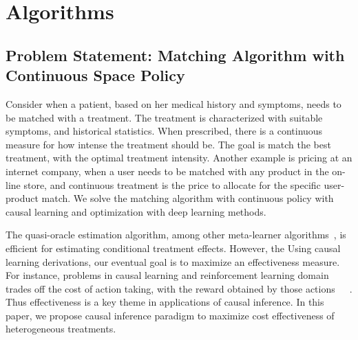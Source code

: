 \documentclass{article}
\begin{document}
\section{Algorithms} 
\subsection{Problem Statement: Matching Algorithm with Continuous Space Policy} 
Consider when a patient, based on her medical history and symptoms, needs to be matched with a treatment. The treatment is characterized with suitable symptoms, and historical statistics. When prescribed, there is a continuous measure for how intense the treatment should be. The goal is match the best treatment, with the optimal treatment intensity. Another example is pricing at an internet company, when a user needs to be matched with any product in the on-line store, and continuous treatment is the price to allocate for the specific user-product match. We solve the matching algorithm with continuous policy with causal learning and optimization with deep learning methods. 

The quasi-oracle estimation algorithm, among other meta-learner algorithms~\cite{kunzel2017meta}, is efficient for estimating conditional treatment effects. However, the Using causal learning derivations, our eventual goal is to maximize an effectiveness measure. For instance, problems in causal learning and reinforcement learning domain trades off the cost of action taking, with the reward obtained by those  actions~\cite{sutton18reinforcement}~\cite{silver16master}~\cite{kool2017cost}. Thus effectiveness is a key theme in applications of causal inference. In this paper, we propose causal inference paradigm to maximize cost effectiveness of heterogeneous treatments. 

\end{document}
